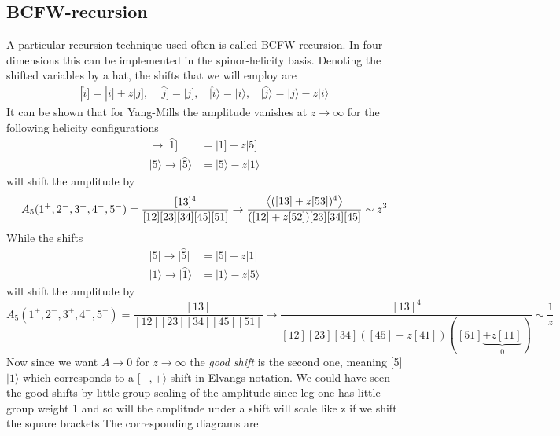 \documentclass[a4paper,12pt]{article}
\begin{document}
\subsection{BCFW-recursion}
%
A particular recursion technique used often is called BCFW recursion. In four dimensions this can be implemented in the spinor-helicity basis. Denoting the shifted variables by a hat, the shifts that we will employ are
\begin{equation}
\begin{aligned}
|\hat i]=|i]+z|j],~~~~|\hat j]=|j],~~~~|\hat i \rangle = | i \rangle,~~~~|\hat j \rangle =|j\rangle-z|i\rangle
\end{aligned}
\end{equation}
%
It can be shown that for Yang-Mills the amplitude vanishes at $z\to \infty$ for the following helicity configurations
%
\begin{align}
[i,j\rangle&~~[-,-\rangle~~[-,+\rangle~~[+,+\rangle~~[+,-\rangle\\
A_n(z)&\sim ~~\frac{1}{z}~~~~~~~\frac{1}{z}~~~~~~~~\frac{1}{z}~~~~~~~~z^3
\end{align}
%
The first 3 types of shifts will be referred to as \textit{good shifts}.
\subsection{Example of BCFW-recursion}
%
As an example, let us calculate the amplitude $A_5(1_g^+,2_g^-,3_g^+,4_g^-,5_g^-)$
Since we are dealing with an $\overline{\text{MHV}}$ amplitude we can immediately read of the good shift since the shifts
\begin{align}
|1]\to|\hat{1}]&=|1]+z|5]\\
|5\rangle\to|\hat{5}\rangle&=|5\rangle-z|1\rangle
\end{align}
will shift the amplitude by
\[
A_{5}(1^+,2^-,3^+,4^-,5^-)=\frac{[13]^4}{[12][23][34][45][51]}\to \frac{\expval{([13]+z[53])^4}}{([12]+z[52])[23][34][45]}\sim z^3
\]
While the shifts
\begin{align}
|5]\to|\hat{5}]&=|5]+z|1]\\
|1\rangle\to|\hat{1}\rangle&=|1\rangle-z|5\rangle
\end{align}
will shift the amplitude by
\[
A_{5}(1^+,2^-,3^+,4^-,5^-)=\frac{[13]}{[12][23][34][45][51]}\to \frac{[13]^4}{[12][23][34]([45]+z[41])([51]\underbrace{+z[11]}_{0})}\sim \frac{1}{z}
\]
Now since we want $A\to 0$ for $z\to \infty$ the \textit{good shift} is the second one, meaning [5] $|1\rangle$ which corresponds to a $[-,+\rangle$ shift in Elvangs notation.
%
We could have seen the good shifts by little group scaling of the amplitude since leg one has little group weight 1 and so will the amplitude under a shift will scale like z if we shift the square brackets
 The corresponding diagrams are
\end{document}
